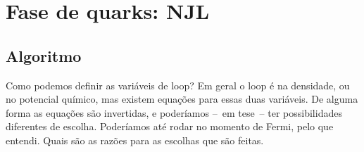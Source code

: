 \section{Fase de quarks: NJL}

\subsection{Algoritmo}

Como podemos definir as variáveis de loop? Em geral o loop é na densidade, ou no potencial químico, mas existem equações para essas duas variáveis. De alguma forma as equações são invertidas, e poderíamos --~em tese~-- ter possibilidades diferentes de escolha. Poderíamos até rodar no momento de Fermi, pelo que entendi. Quais são as razões para as escolhas que são feitas.


